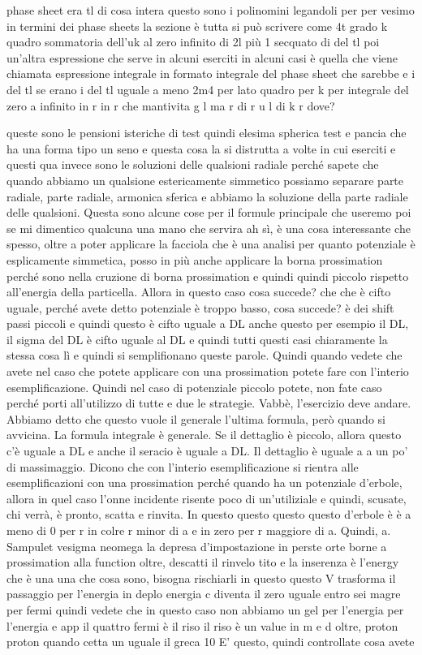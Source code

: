 \begin{soluzione}
{phase sheet era tl di cosa intera questo sono i polinomini legandoli per per vesimo in termini dei phase sheets la sezione è tutta si può scrivere come 4t grado k quadro sommatoria dell'uk al zero infinito di 2l più 1 secquato di del tl poi un'altra espressione che serve in alcuni eserciti in alcuni casi è quella che viene chiamata espressione integrale in formato integrale del phase sheet che sarebbe e i del tl se erano i del tl uguale a meno 2m4 per lato quadro per k per integrale del zero a infinito in r in r che mantivita g l ma r di r u l di k r dove?
   
   queste sono le pensioni isteriche di test quindi elesima spherica test e pancia che ha una forma tipo un seno e questa cosa la si distrutta a volte in cui eserciti e questi qua invece sono le soluzioni delle qualsioni radiale perché sapete che quando abbiamo un qualsione estericamente simmetico possiamo separare parte radiale, parte radiale, armonica sferica e abbiamo la soluzione della parte radiale delle qualsioni. Questa sono alcune cose per il formule principale che useremo poi se mi dimentico qualcuna una mano che servira ah sì, è una cosa interessante che spesso, oltre a poter applicare la facciola che è una analisi per quanto potenziale è esplicamente simmetica, posso in più anche applicare la borna prossimation perché sono nella cruzione di borna prossimation e quindi quindi piccolo rispetto all'energia della particella. Allora in questo caso cosa succede? che che è cifto uguale, perché avete detto potenziale è troppo basso, cosa succede? è dei shift passi piccoli e quindi questo è cifto uguale a DL anche questo per esempio il DL, il sigma del DL è cifto uguale al DL e quindi tutti questi casi chiaramente la stessa cosa lì e quindi si semplifionano queste parole. Quindi quando vedete che avete nel caso che potete applicare con una prossimation potete fare con l'interio esemplificazione. Quindi nel caso di potenziale piccolo potete, non fate caso perché porti all'utilizzo di tutte e due le strategie. Vabbè, l'esercizio deve andare. Abbiamo detto che questo vuole il generale l'ultima formula, però quando si avvicina. La formula integrale è generale. Se il dettaglio è piccolo, allora questo c'è uguale a DL e anche il seracio è uguale a DL. Il dettaglio è uguale a a un po' di massimaggio. Dicono che con l'interio esemplificazione si rientra alle esemplificazioni con una prossimation perché quando ha un potenziale d'erbole, allora in quel caso l'onne incidente risente poco di un'utiliziale e quindi, scusate, chi verrà, è pronto, scatta e rinvita. In questo questo questo questo d'erbole è è a meno di 0 per r in colre r minor di a e in zero per r maggiore di a. Quindi, a. Sampulet vesigma neomega la depresa d'impostazione in perste orte borne a prossimation alla function oltre, descatti il rinvelo tito e la inserenza è l'energy che è una una che cosa sono, bisogna rischiarli in questo questo V trasforma il passaggio per l'energia in deplo energia c diventa il zero uguale entro sei magre per fermi quindi vedete che in questo caso non abbiamo un gel per l'energia per l'energia e app il quattro fermi è il riso il riso è un value in m e d oltre, proton proton quando cetta un uguale il greca 10 E' questo, quindi controllate cosa avete }
\end{soluzione}
